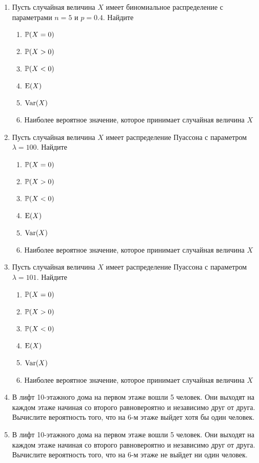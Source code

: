 \begin{enumerate}
\item Пусть случайная величина $X$ имеет биномиальное распределение с
параметрами $n = 5$ и $p = 0.4$.
Найдите
\begin{enumerate}
	\item $\P(X = 0)$
	\item $\P(X > 0)$
	\item $\P(X < 0)$
	\item $\E(X)$
	\item $\Var(X)$
	\item Наиболее вероятное значение, которое принимает случайная величина $X$
\end{enumerate}

\item  Пусть случайная величина $X$ имеет распределение Пуассона с параметром $\lambda = 100$.
Найдите
\begin{enumerate}
	\item $\P(X = 0)$
	\item $\P(X > 0)$
	\item $\P(X < 0)$
	\item $\E(X)$
	\item $\Var(X)$
	\item Наиболее вероятное значение, которое принимает случайная величина $X$
\end{enumerate}

\item  Пусть случайная величина $X$ имеет распределение Пуассона с параметром $\lambda = 101$.
Найдите
\begin{enumerate}
	\item $\P(X = 0)$
	\item $\P(X > 0)$
	\item $\P(X < 0)$
	\item $\E(X)$
	\item $\Var(X)$
	\item Наиболее вероятное значение, которое принимает случайная величина $X$
\end{enumerate}

\item В лифт 10-этажного дома на первом этаже вошли 5 человек.
Они выходят на каждом этаже начиная со второго равновероятно и независимо
друг от друга.
Вычислите вероятность того, что на 6-м этаже выйдет хотя бы один человек.

\item В лифт 10-этажного дома на первом этаже вошли 5 человек.
Они выходят на каждом этаже начиная со второго равновероятно и независимо
друг от друга.
Вычислите вероятность того, что на 6-м этаже не выйдет ни один человек.


\end{enumerate}
